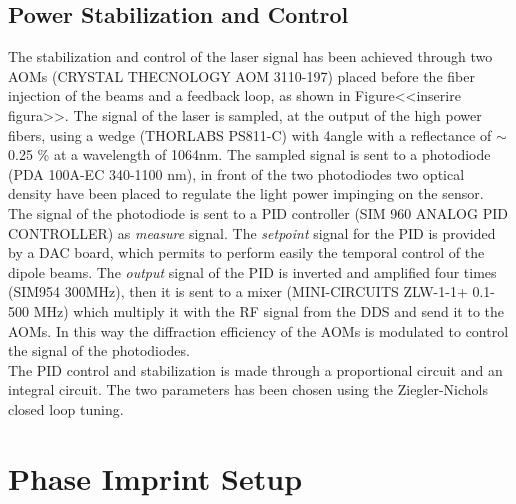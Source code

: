 \documentclass[../thesis.tex]{subfiles}
\begin{document}
\subsection{Power Stabilization and Control}

The stabilization and control of the laser signal has been achieved through two AOMs (CRYSTAL THECNOLOGY AOM 3110-197) placed before the fiber injection of the beams and a feedback loop, as shown in Figure<<inserire figura>>. The signal of the laser is sampled, at the output of the high power fibers, using a wedge (THORLABS PS811-C) with 4\degree angle with a reflectance of $\sim$ 0.25 \% at a wavelength of 1064nm. The sampled signal is sent to a photodiode (PDA 100A-EC 340-1100 nm), in front of the two photodiodes two optical density have been placed to regulate the light power impinging on the sensor. The signal of the photodiode is sent to a PID controller (SIM 960 ANALOG PID CONTROLLER) as \textit{measure} signal. The \textit{setpoint} signal for the PID is provided by a DAC board, which permits to perform easily the temporal control of the dipole beams. The \textit{output} signal of the PID is inverted and amplified four times (SIM954 300MHz), then it is sent to a mixer (MINI-CIRCUITS ZLW-1-1+ 0.1-500 MHz) which multiply it with the RF signal from the DDS and send it to the AOMs. In this way the diffraction efficiency of the AOMs is modulated to control the signal of the photodiodes.\\
The PID control and stabilization is made through a proportional circuit and an integral circuit. The two parameters has been chosen using the Ziegler-Nichols closed loop tuning.


\section{Phase Imprint Setup}
\end{document}
